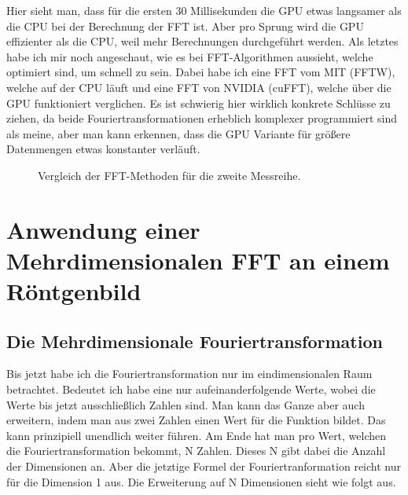\documentclass[a4paper,12pt]{article}
\theoremstyle{definition}
\theoremstyle{remark}
\begin{document}
Hier sieht man, dass für die ersten 30 Millisekunden die GPU etwas langsamer als die CPU bei der Berechnung der FFT ist. 
Aber pro Sprung wird die GPU effizienter als die CPU, weil mehr Berechnungen durchgeführt werden. Als letztes habe ich mir 
noch angeschaut, wie es bei FFT-Algorithmen aussieht, welche optimiert sind, um schnell zu sein. Dabei habe ich eine FFT 
vom MIT (FFTW), welche auf der CPU läuft und eine FFT von NVIDIA (cuFFT), welche über die GPU funktioniert verglichen. Es ist schwierig 
hier wirklich konkrete Schlüsse zu ziehen, da beide Fouriertransformationen erheblich komplexer programmiert sind als meine,
aber man kann erkennen, dass die GPU Variante für größere Datenmengen etwas konstanter verläuft.

\begin{figure}[H]
  \centering
  \caption{Vergleich der FFT-Methoden für die zweite Messreihe.}
\end{figure}

\section{Anwendung einer Mehrdimensionalen FFT an einem Röntgenbild}
\subsection{Die Mehrdimensionale Fouriertransformation}
Bis jetzt habe ich die Fouriertransformation nur im eindimensionalen Raum betrachtet. Bedeutet ich habe eine nur aufeinanderfolgende Werte, 
wobei die Werte bis jetzt ausschließlich Zahlen sind. Man kann das Ganze aber auch erweitern, indem man aus zwei Zahlen einen Wert für die 
Funktion bildet. Das kann prinzipiell unendlich weiter führen. Am Ende hat man pro Wert, welchen die Fouriertransformation bekommt, N Zahlen.
Dieses N gibt dabei die Anzahl der Dimensionen an. Aber die jetztige Formel der Fouriertranformation reicht nur für die Dimension 1 aus. Die 
Erweiterung auf N Dimensionen sieht wie folgt aus. 
\end{document}
